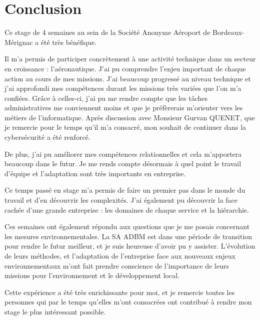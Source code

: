 \chapter{Conclusion}

Ce stage de 4 semaines au sein de la Société Anonyme Aéroport de Bordeaux-Mérignac a été très bénéfique.\newline

Il m'a permis de participer concrètement à une activité technique dans un secteur en croissance : l'aéronautique. J'ai pu comprendre l'enjeu important de chaque action au cours de mes missions. J'ai beaucoup progressé au niveau technique et j'ai approfondi mes compétences durant les missions très variées que l'on m'a confiées. Grâce à celles-ci, j'ai pu me rendre compte que les tâches administratives me conviennent moins et que je préfèrerais m'orienter vers les métiers de l'informatique. Après discussion avec Monsieur Gurvan QUENET, que je remercie pour le temps qu'il m'a consacré, mon souhait de continuer dans la cybersécurité a été renforcé.

De plus, j'ai pu améliorer mes compétences relationnelles et cela m'apportera beaucoup dans le futur. Je me rends compte désormais à quel point le travail d'équipe et l'adaptation sont très importants en entreprise.

Ce temps passé en stage m’a permis de faire un premier pas dans le monde du travail et d’en découvrir les complexités. J’ai également pu découvrir la face cachée d’une grande entreprise : les domaines de chaque service et la hiérarchie.\newline

Ces semaines ont également répondu aux questions que je me posais concernant les mesures environnementales. La SA ADBM est dans une période de transition pour rendre le futur meilleur, et je suis heureuse d'avoir pu y assister. L'évolution de leurs méthodes, et l'adaptation de l'entreprise face aux nouveaux enjeux environnementaux m'ont fait prendre conscience de l'importance de leurs missions pour l'environnement et le développement local.\newline

Cette expérience a été très enrichissante pour moi, et je remercie toutes les personnes qui par le temps qu'elles m'ont consacrées ont contribué à rendre mon stage le plus intéressant possible.